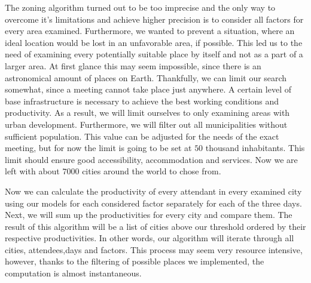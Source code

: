 
The zoning algorithm turned out to be too imprecise and the only way to overcome it's limitations and achieve higher precision is to consider all factors for every area examined. Furthermore, we wanted to prevent a situation, where an ideal location would be lost in an unfavorable area, if possible. This led us to the need of examining every potentially suitable place by itself and not as a part of a larger area. At first glance this may seem impossible, since there is an astronomical amount of places on Earth. Thankfully, we can limit our search somewhat, since a meeting cannot take place just anywhere. A certain level of base infrastructure is necessary to achieve the best working conditions and productivity. As a result, we will limit ourselves to only examining areas with urban development. Furthermore, we will filter out all municipalities without sufficient population. This value can be adjusted for the needs of the exact meeting, but for now the limit is going to be set at $50$ thousand inhabitants. This limit should ensure good accessibility, accommodation and services. Now we are left with about $7000$ cities around the world to chose from.

Now we can calculate the productivity of every attendant in every examined city using our models for each considered factor separately for each of the three days. Next, we will sum up the productivities for every city and compare them. The result of this algorithm will be a list of cities above our threshold ordered by their respective productivities. In other words, our algorithm will iterate through all cities, attendees,days and factors. This process may seem very resource intensive, however, thanks to the filtering of possible places we implemented, the computation is almost instantaneous.